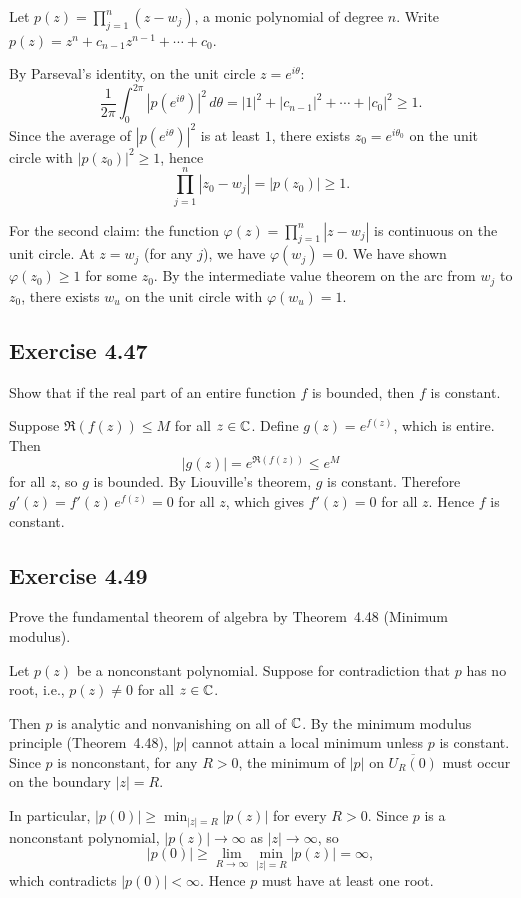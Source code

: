 \documentclass{article}
\begin{document}
\begin{solution}
  Let $p(z) = \prod_{j=1}^{n}(z - w_j)$, a monic polynomial of
  degree $n$. Write $p(z) = z^n + c_{n-1}z^{n-1} + \cdots + c_0$.

  By Parseval's identity, on the unit circle $z = e^{i\theta}$:
  \[
    \frac{1}{2\pi}\int_0^{2\pi} |p(e^{i\theta})|^2 \, d\theta
    = |1|^2 + |c_{n-1}|^2 + \cdots + |c_0|^2
    \ge 1.
  \]
  Since the average of $|p(e^{i\theta})|^2$ is at least $1$, there
  exists $z_0 = e^{i\theta_0}$ on the unit circle with
  $|p(z_0)|^2 \ge 1$, hence
  \[
    \prod_{j=1}^{n} |z_0 - w_j| = |p(z_0)| \ge 1.
  \]

  For the second claim: the function
  $\varphi(z) = \prod_{j=1}^n |z - w_j|$ is continuous on the unit
  circle. At $z = w_j$ (for any $j$), we have $\varphi(w_j) = 0$.
  We have shown $\varphi(z_0) \ge 1$ for some $z_0$.
  By the intermediate value theorem on the arc from $w_j$ to $z_0$,
  there exists $w_u$ on the unit circle with $\varphi(w_u) = 1$.
\end{solution}

\subsection{Exercise 4.47}

Show that if the real part of an entire function $f$ is bounded,
then $f$ is constant.

\begin{solution}
  Suppose $\Re(f(z)) \le M$ for all $z \in \mathbb{C}$. Define
  $g(z) = e^{f(z)}$, which is entire. Then
  \[
    |g(z)| = e^{\Re(f(z))} \le e^M
  \]
  for all $z$, so $g$ is bounded.
  By Liouville's theorem, $g$ is constant.
  Therefore $g'(z) = f'(z)\,e^{f(z)} = 0$ for all $z$,
  which gives $f'(z) = 0$ for all $z$. Hence $f$ is constant.
\end{solution}

\subsection{Exercise 4.49}

Prove the fundamental theorem of algebra by Theorem~4.48
(Minimum modulus).

\begin{solution}
  Let $p(z)$ be a nonconstant polynomial. Suppose for contradiction
  that $p$ has no root, i.e., $p(z) \ne 0$ for all $z \in \mathbb{C}$.

  Then $p$ is analytic and nonvanishing on all of $\mathbb{C}$.
  By the minimum modulus principle (Theorem~4.48),
  $|p|$ cannot attain a local minimum unless $p$ is constant.
  Since $p$ is nonconstant, for any $R > 0$, the minimum of $|p|$
  on $\overline{U_R(0)}$ must occur on the boundary $|z| = R$.

  In particular, $|p(0)| \ge \min_{|z|=R} |p(z)|$ for every $R > 0$.
  Since $p$ is a nonconstant polynomial, $|p(z)| \to \infty$
  as $|z| \to \infty$, so
  \[
    |p(0)| \ge \lim_{R \to \infty} \min_{|z|=R} |p(z)| = \infty,
  \]
  which contradicts $|p(0)| < \infty$.
  Hence $p$ must have at least one root.
\end{solution}
\end{document}
